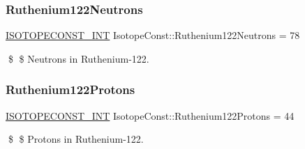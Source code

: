 \subsubsection{\texorpdfstring{Ruthenium122\+Neutrons}{Ruthenium122Neutrons}}
{\footnotesize\ttfamily \mbox{\hyperlink{group___isotope_const-_macros_ga5f18360b3e99483a35c32d789e62621c}{I\+S\+O\+T\+O\+P\+E\+C\+O\+N\+S\+T\+\_\+\+I\+NT}} Isotope\+Const\+::\+Ruthenium122\+Neutrons = 78}

\$ \$ Neutrons in Ruthenium-\/122. \mbox{\label{group___isotope_const-_ruthenium-_ru122_gac3e146f9105812b4cddc8fb8bd471435}} 
\subsubsection{\texorpdfstring{Ruthenium122\+Protons}{Ruthenium122Protons}}
{\footnotesize\ttfamily \mbox{\hyperlink{group___isotope_const-_macros_ga5f18360b3e99483a35c32d789e62621c}{I\+S\+O\+T\+O\+P\+E\+C\+O\+N\+S\+T\+\_\+\+I\+NT}} Isotope\+Const\+::\+Ruthenium122\+Protons = 44}

\$ \$ Protons in Ruthenium-\/122. 